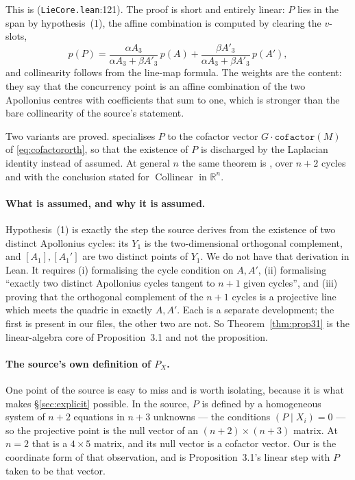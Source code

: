 \documentclass[11pt]{article}
\theoremstyle{definition}
\theoremstyle{remark}
\newcommand{\src}[3]{\texttt{#2}:#3}
\newcommand{\RR}{\mathbb{R}}
\begin{document}
This is  (\src{PaperK}{LieCore.lean}{121}). The proof is short and entirely
linear: $P$ lies in the span by hypothesis~(1), the affine combination is computed by clearing the
$v$-slots,
\[
p(P)=\frac{\alpha A_3}{\alpha A_3+\beta A'_3}\,p(A)+\frac{\beta A'_3}{\alpha A_3+\beta A'_3}\,p(A'),
\]
and collinearity follows from the line-map formula. The weights are the content: they say that the
concurrency point is an affine combination of the two Apollonius centres with coefficients that sum
to one, which is stronger than the bare collinearity of the source's statement.

Two variants are proved.  specialises $P$ to the cofactor vector
$G\cdot\texttt{cofactor}(M)$ of \eqref{eq:cofactororth}, so that the existence of $P$ is discharged
by the Laplacian identity instead of assumed. At general $n$ the same theorem is
, over $n+2$ cycles and with the conclusion stated for
$\operatorname{Collinear}$ in $\RR^n$.

\paragraph{What is assumed, and why it is assumed.} Hypothesis~(1) is exactly the step the source
derives from the existence of two distinct Apollonius cycles: its $Y_1$ is the two-dimensional
orthogonal complement, and $[A_1],[A_1']$ are two distinct points of $Y_1$. We do not have that
derivation in Lean. It requires (i) formalising the cycle condition on $A,A'$, (ii) formalising
``exactly two distinct Apollonius cycles tangent to $n+1$ given cycles'', and (iii) proving that the
orthogonal complement of the $n+1$ cycles is a projective line which meets the quadric in exactly
$A,A'$. Each
is a separate development; the first is present in our files, the other two are not. So
Theorem~\ref{thm:prop31} is the linear-algebra core of Proposition~3.1 and not the proposition.

\paragraph{The source's own definition of $P_X$.} One point of the source is easy to miss and is
worth isolating, because it is what makes \S\ref{sec:explicit} possible. In the source, $P$ is
defined by a homogeneous system of $n+2$ equations in $n+3$ unknowns --- the conditions
$(P\mid X_i)=0$ --- so the projective point is the null vector of an $(n+2)\times(n+3)$ matrix. At
$n=2$ that is a $4\times5$ matrix, and its null vector is a cofactor vector. Our
 is the coordinate form of that observation, and
 is Proposition~3.1's linear step with $P$ taken to be that vector.
\end{document}
